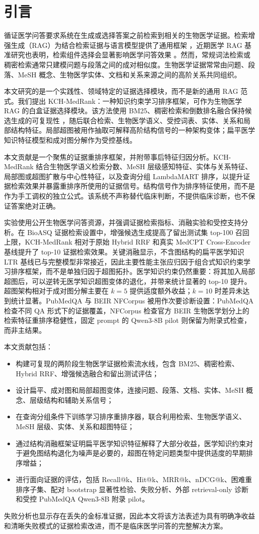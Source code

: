 \section{引言}

循证医学问答要求系统在生成或选择答案之前检索到相关的生物医学证据。检索增强生成（RAG）为结合检索证据与语言模型提供了通用框架 \citep{lewis2020rag}，近期医学 RAG 基准研究也表明，检索组件选择会显著影响医学问答效果 \citep{xiong2024benchmarking}。然而，常规词法检索或稠密检索通常只建模问题与段落之间的成对相似度。生物医学证据常常由问题、段落、MeSH 概念、生物医学实体、文档和关系来源之间的高阶关系共同组织。

本文研究的是一个实践性、领域特定的证据选择模块，而不是新的通用 RAG 范式。我们提出 KCH-MedRank：一种知识约束学习排序框架，可作为生物医学 RAG 的白盒证据选择模块。该方法使用 BM25、稠密检索和倒数排名融合保持候选生成的可复现性 \citep{robertson2009bm25,cormack2009rrf}，随后联合检索、生物医学语义、受控词表、实体、关系和局部结构特征。局部超图被用作抽取可解释高阶结构信号的一种架构变体；扁平医学知识特征模型和成对图分解作为受控基线。

本文贡献是一个聚焦的证据重排序框架，并附带事后特征归因分析。KCH-MedRank 结合生物医学语义检索分数、MeSH 层级感知特征、实体与关系特征、局部图或超图扩散与中心性特征，以及查询分组 LambdaMART 排序，以提升证据检索效果并暴露重排序所使用的证据信号。结构信号作为排序特征使用，而不是作为手工调权的独立公式。该系统不声称替代临床判断，不提供临床诊断，也不保证答案绝对正确。

实验使用公开生物医学问答资源，并强调证据检索指标、消融实验和受控支持分析。在 BioASQ 证据检索设置中，增强候选生成提高了留出测试集 top-100 召回上限，KCH-MedRank 相对于原始 Hybrid RRF 和真实 MedCPT Cross-Encoder 基线提升了 top-10 证据检索效果。关键消融显示，不含图结构的扁平医学知识 LTR 基线已与完整模型非常接近，因此主要性能主张应归因于组合式知识约束学习排序框架，而不是单独归因于超图拓扑。医学知识约束仍然重要：将其加入局部超图后，可以逆转无医学知识超图变体的退化，并带来统计显著的 top-10 提升。超图架构相对于成对图分解主要在 $k{=}5$ 提供适度额外收益；$k{=}10$ 时差异未达到统计显著。PubMedQA 与 BEIR NFCorpus 被用作次要诊断设置：PubMedQA 检查不同 QA 形式下的证据覆盖，NFCorpus 检查官方 BEIR 生物医学划分上的检索特征重排序稳健性，固定 prompt 的 Qwen3-8B pilot 则保留为附录式检查，而非主结果。

本文贡献包括：
\begin{itemize}
  \item 构建可复现的两阶段生物医学证据检索流水线，包含 BM25、稠密检索、Hybrid RRF、增强候选融合和留出测试评估；
  \item 设计扁平、成对图和局部超图变体，连接问题、段落、文档、实体、MeSH 概念、层级结构和辅助关系信号；
  \item 在查询分组条件下训练学习排序重排序器，联合利用检索、生物医学语义、MeSH 层级、实体、关系和超图特征；
  \item 通过结构消融框架证明扁平医学知识特征解释了大部分收益，医学知识约束对于避免图结构退化为噪声是必要的，超图在特定问题类型中提供适度的早期排序增益；
  \item 进行面向证据的评估，包括 Recall@k、Hit@k、MRR@k、nDCG@k、困难重排序子集、配对 bootstrap 显著性检验、失败分析、外部 retrieval-only 诊断和受控 PubMedQA Qwen3-8B 附录 pilot。
\end{itemize}

失败分析也显示存在丢失的金标准证据，因此本文将该方法表述为具有明确净收益和清晰失败模式的证据检索改进，而不是临床医学问答的完整解决方案。
